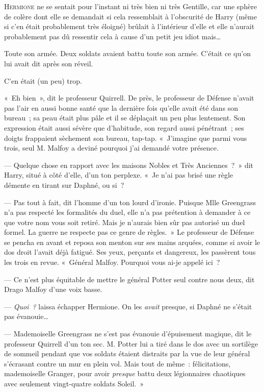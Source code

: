 
\lettrine{H}{ermione} ne se sentait pour l'instant ni très bien ni très Gentille, car une sphère de colère dont elle se demandait si cela ressemblait à l'obscurité de Harry (même si c'en était probablement très éloigné) brûlait à l'intérieur d'elle et elle n'aurait probablement pas dû ressentir cela à cause d'un petit jeu idiot mais…

Toute son armée.
Deux soldats avaient battu toute son armée.
C'était ce qu'on lui avait dit après son réveil.

C'en était (un peu) trop.

«~Eh bien~», dit le professeur Quirrell.
De près, le professeur de Défense n'avait pas l'air en aussi bonne santé que la dernière fois qu'elle avait été dans son bureau~; sa peau était plus pâle et il se déplaçait un peu plus lentement.
Son expression était aussi sévère que d'habitude, son regard aussi pénétrant~; ses doigts frappaient sèchement son bureau, tap-tap.
«~J'imagine que parmi vous trois, seul M. Malfoy a deviné pourquoi j'ai demandé votre présence.

--- Quelque chose en rapport avec les maisons Nobles et Très Anciennes~?~»
dit Harry, situé à côté d'elle, d'un ton perplexe.
«~Je n'ai pas brisé une règle démente en tirant sur Daphné, ou si~?

--- Pas tout à fait, dit l'homme d'un ton lourd d'ironie.
Puisque Mlle Greengrass n'a pas respecté les formalités du duel, elle n'a pas prétention à demander à ce que votre nom vous soit retiré.
Mais je n'aurais bien sûr pas autorisé un duel formel.
La guerre ne respecte pas ce genre de règles.~»
Le professeur de Défense se pencha en avant et reposa son menton sur ses mains arquées, comme si avoir le dos droit l'avait déjà fatigué.
Ses yeux, perçants et dangereux, les passèrent tous les trois en revue.
«~Général Malfoy.
Pourquoi vous ai-je appelé ici~?

--- Ce n'est plus équitable de mettre le général Potter seul contre nous deux, dit Drago Malfoy d'une voix basse.

--- \emph{Quoi~?} laissa échapper Hermione.
On les \emph{avait} presque, si Daphné ne s'était pas évanouie…

--- Mademoiselle Greengrass ne s'est pas évanouie d'épuisement magique, dit le professeur Quirrell d'un ton sec.
M. Potter lui a tiré dans le dos avec un sortilège de sommeil pendant que vos soldats étaient distraits par la vue de leur général s'écrasant contre un mur en plein vol.
Mais tout de même~: félicitations, mademoiselle Granger, pour avoir \emph{presque} battu deux légionnaires chaotiques avec seulement vingt-quatre soldats Soleil.~»

